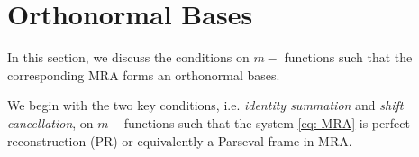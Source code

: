 \section{Orthonormal Bases}\label{sec: orth}

In this section, we discuss the conditions on $m-$ functions such that the corresponding MRA forms an orthonormal bases. 

We begin with the two key conditions, i.e. {\it identity summation} and {\it shift cancellation}, on $m-$functions such that the system \eqref{eq: MRA} is perfect reconstruction (PR) or equivalently a Parseval frame in MRA.%

